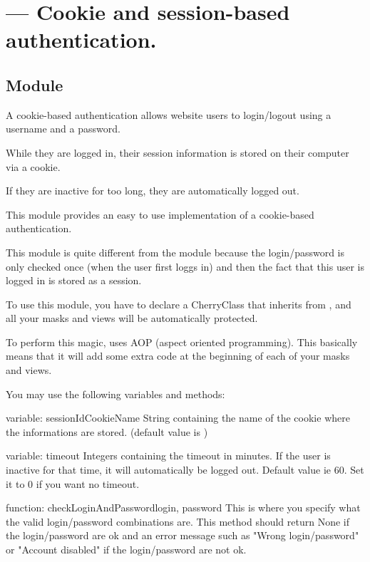 \section{ --- Cookie and session-based authentication.}

\subsection{Module}
A cookie-based authentication allows website users to login/logout using a username and a password.

While they are logged in, their session information is stored on their computer via a cookie.

If they are inactive for too long, they are automatically logged out.

This module provides an easy to use implementation of a cookie-based authentication.

This module is quite different from the  module because
the login/password is only checked once (when the user first loggs in) and then
the fact that this user is logged in is stored as a session.


To use this module, you have to declare a CherryClass that inherits from , and all your masks
and views will be automatically protected.

To perform this magic,  uses AOP (aspect oriented programming). This basically means
that it will add some extra code at the beginning of each of your masks and views.

You may use the following variables and methods:

\begin{memberdesc}{variable: sessionIdCookieName}
String containing the name of the cookie where the  informations are stored. (default value is )
\end{memberdesc}
\begin{memberdesc}{variable: timeout}
Integers containing the timeout in minutes. If the user is inactive for that time, it will
automatically be logged out. Default value ie 60. Set it to 0 if you want no timeout.
\end{memberdesc}

\begin{funcdesc}{function: checkLoginAndPassword}{login, password}
This is where you specify what the valid login/password combinations are.
This method should return None if the login/password are ok and an error message such as "Wrong login/password" or "Account disabled" if
the login/password are not ok.
\end{funcdesc}

